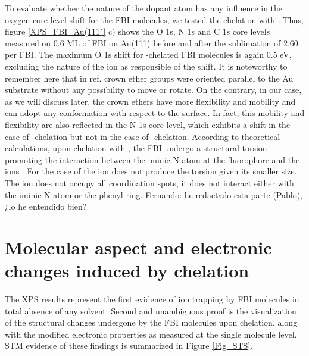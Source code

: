 \documentclass[aps,prl,reprint,longbibliography,superscriptaddress, english]{revtex4-1}
\newcommand{\completar}[1]{{\color{red} #1}}
\begin{document}
To evaluate whether the nature of the dopant atom has any influence in the oxygen core level shift for the FBI molecules, we tested the chelation with \Nap. Thus, figure \ref{XPS_FBI_Au(111)} c) shows the O 1s, N 1s and C 1s core levels measured on 0.6 ML of FBI on Au(111) before and after the sublimation of 2.60 \Nap per FBI. The maximum O 1s shift for \Nap-chelated FBI molecules is again 0.5 eV, excluding the nature of the ion as responsible of the shift.
It is noteworthy to remember here that in ref. \cite{stredansky_-surface_2019} crown ether groups were oriented parallel to the Au substrate without any possibility to move or rotate. On the contrary, in our case, as we will discuss later, the crown ethers have more flexibility and mobility and can adopt any conformation with respect to the surface. In fact, this mobility and flexibility are also reflected in the N 1s core level, which exhibits a shift in the case of \Bapp-chelation but not in the case of \Nap-chelation.
According to theoretical calculations, upon chelation with \Bapp, the FBI undergo a structural torsion promoting the interaction between the iminic N atom at the fluorophore and the ions \cite{rivilla_fluorescent_2020}. For the case of \Nap the ion does not produce the torsion given its smaller size. The \Nap ion does not  occupy all coordination spots, it does not interact either with the iminic N atom or the phenyl ring. \completar{Fernando: he redactado esta parte (Pablo), ¿lo he entendido bien? }



\section{Molecular aspect and electronic changes induced by chelation}

The XPS results represent the first evidence of ion trapping by FBI molecules in total absence of any solvent. Second and unambiguous proof is the visualization of the structural changes undergone by the FBI molecules upon chelation, along with the modified electronic properties as measured at the single molecule level. STM evidence of these findings is summarized in Figure \ref{Fig_STS}. 
\end{document}
